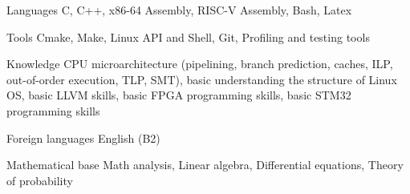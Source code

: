 
\begin{cvskills}

  \cvskill
    {Languages} %
    {C, C++, x86-64 Assembly, RISC-V Assembly, Bash, Latex} %

  \cvskill
    {Tools} %
    {Cmake, Make, Linux API and Shell, Git, Profiling and testing tools} %

  \cvskill
    {Knowledge} %
    {CPU microarchitecture (pipelining, branch prediction, caches, ILP, out-of-order execution, TLP, SMT), basic understanding the structure of Linux OS, basic LLVM skills, basic FPGA programming skills, basic STM32 programming skills} %

  \cvskill
    {Foreign languages} %
    {English (B2)} %

  \cvskill
  {Mathematical base} %
  {Math analysis, Linear algebra, Differential equations, Theory of probability} %

\end{cvskills}
